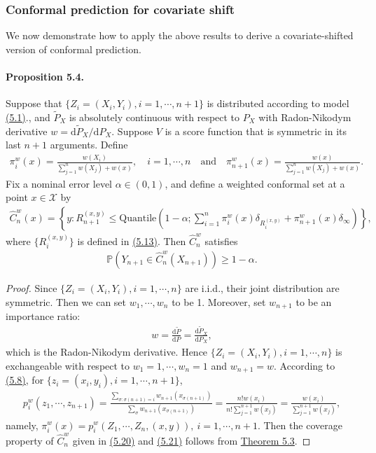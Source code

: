 \documentclass{article}
\numberwithin{equation}{section}
\begin{document}
\subsubsection{Conformal prediction for covariate shift}
We now demonstrate how to apply the above results to derive a covariate-shifted version of conformal prediction.
\paragraph{Proposition 5.4.} Suppose that $\{Z_i=(X_i,Y_i),i=1,\cdots,n+1\}$ is distributed according to model \hyperref[5.1]{(5.1)}., and $\widetilde{P}_X$ is absolutely continuous with respect to $P_X$ with Radon-Nikodym derivative $w=\mathrm{d}\widetilde{P}_X/\mathrm{d}P_X$. Suppose $V$ is a score function that is symmetric in its last $n+1$ arguments. Define
\begin{align*}
	\pi_i^w(x) = \frac{w(X_i)}{\sum_{j=1}^nw(X_j) + w(x)},\quad i=1,\cdots,n\quad\text{and}\quad \pi_{n+1}^w(x) = \frac{w(x)}{\sum_{j=1}^nw(X_j) + w(x)}.\tag{5.19}\label{5.19}
\end{align*}
Fix a nominal error level $\alpha\in(0,1)$, and define a weighted conformal set at a point $x\in\mathcal{X}$ by
\begin{align*}
	\widehat{C}_n^w(x) = \left\{y:R_{n+1}^{(x,y)}\leq\mathrm{Quantile}\left(1-\alpha;\sum_{i=1}^n \pi_i^w(x)\delta_{R_i^{(x,y)}} + \pi_{n+1}^w(x)\delta_\infty\right)\right\},\tag{5.20}\label{5.20}
\end{align*}
where $\{R_i^{(x,y)}\}$ is defined in \hyperref[5.13]{(5.13)}. Then $\widehat{C}_n^w$ satisfies
\begin{align*}
\mathbb{P}\left(Y_{n+1}\in\widehat{C}_n^w(X_{n+1})\right)\geq 1-\alpha.\tag{5.21}\label{5.21}
\end{align*}

\begin{proof}
Since $\{Z_i=(X_i,Y_i),i=1,\cdots,n\}$ are i.i.d., their joint distribution are symmetric. Then we can set $w_1,\cdots,w_n$ to be 1. Moreover, set $w_{n+1}$ to be an importance ratio:
\begin{align*}
	w = \frac{\mathrm{d}\widetilde{P}}{\mathrm{d}P} = \frac{\mathrm{d}\widetilde{P}_X}{\mathrm{d}P_X},\tag{5.22}
\end{align*}
which is the Radon-Nikodym derivative. Hence $\{Z_i=(X_i,Y_i),i=1,\cdots,n\}$ is exchangeable with respect to $w_1=1,\cdots,w_n=1$ and $w_{n+1}=w$. According to \hyperref[5.8]{(5.8)}, for $\{z_i=(x_i,y_i),i=1,\cdots,n+1\}$,
\begin{align*}
	p_i^w(z_1,\cdots,z_{n+1}) = \frac{\sum_{\sigma:\sigma(n+1)=i}w_{n+1}(x_{\sigma(n+1)})}{\sum_{\sigma} w_{n+1}(x_{\sigma(n+1)})} = \frac{n!w(x_i)}{n!\sum_{j=1}^{n+1}w(x_j)} = \frac{w(x_i)}{\sum_{j=1}^{n+1}w(x_j)},\tag{5.23}
\end{align*}
namely, $\pi_i^w(x) = p_i^w(Z_1,\cdots,Z_n,(x,y)),\ i=1,\cdots,n+1.$ Then the coverage property of $\widehat{C}_n^w$ given in \hyperref[5.20]{(5.20)} and \hyperref[5.21]{(5.21)} follows from \hyperref[Theorem 5.3]{Theorem 5.3}.
\end{proof}
\end{document}
